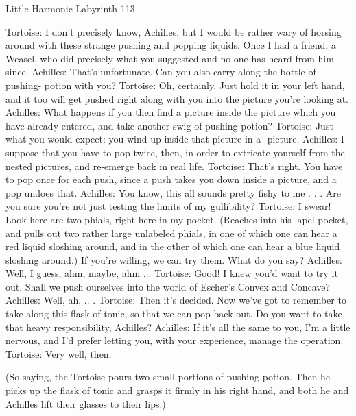 Little Harmonic Labyrinth                                                                 113

          Tortoise: I don’t precisely know, Achilles, but I would be rather wary of
                 horsing around with these strange pushing and popping liquids. Once I
                 had a friend, a Weasel, who did precisely what you suggested-and no
                 one has heard from him since.
          Achilles: That's unfortunate. Can you also carry along the bottle of pushing-
                 potion with you?
          Tortoise: Oh, certainly. Just hold it in your left hand, and it too will get
                 pushed right along with you into the picture you're looking at.
          Achilles: What happens if you then find a picture inside the picture which you
                 have already entered, and take another swig of pushing-potion?
          Tortoise: Just what you would expect: you wind up inside that picture-in-a-
                 picture.
          Achilles: I suppose that you have to pop twice, then, in order to extricate
                 yourself from the nested pictures, and re-emerge back in real life.
          Tortoise: That's right. You have to pop once for each push, since a push takes
                 you down inside a picture, and a pop undoes that.
          Achilles: You know, this all sounds pretty fishy to me . . . Are you sure you're
                 not just testing the limits of my gullibility?
          Tortoise: I swear! Look-here are two phials, right here in my pocket.
                 (Reaches into his lapel pocket, and pulls out two rather large
                 unlabeled phials, in one of which one can hear a red liquid sloshing
                 around, and in the other of which one can hear a blue liquid sloshing
                 around.) If you're willing, we can try them. What do you say?
          Achilles: Well, I guess, ahm, maybe, ahm ...
          Tortoise: Good! I knew you'd want to try it out. Shall we push ourselves into
                 the world of Escher's Convex and Concave?
          Achilles: Well, ah, .. .
          Tortoise: Then it's decided. Now we've got to remember to take along this
                 flask of tonic, so that we can pop back out. Do you want to take that
                 heavy responsibility, Achilles?
          Achilles: If it's all the same to you, I'm a little nervous, and I'd prefer letting
                 you, with your experience, manage the operation.
          Tortoise: Very well, then.

             (So saying, the Tortoise pours two small portions of pushing-potion. Then
             he picks up the flask of tonic and grasps it firmly in his right hand, and
             both he and Achilles lift their glasses to their lips.)

